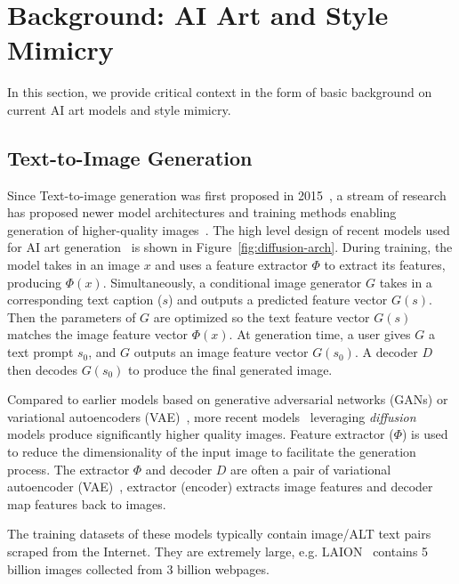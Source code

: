 \secspace
\section{Background: AI Art and Style Mimicry}
\label{sec:motivation}

In this section, we provide critical context in the form of
basic background on current AI art models and style mimicry.

\secspace
\subsection{Text-to-Image Generation}

Since Text-to-image generation was first proposed in
2015~\cite{mansimov2015generating}, a stream of research has proposed newer
model architectures and training methods enabling generation of
higher-quality
images~\cite{radford2015unsupervised,zhang2017stackgan,xu2018attngan,li2019object,zhu2019dm}.  The high level design of
recent models used for AI art
generation~\cite{rombach2022high,ramesh2021zero,d-mini} is shown in
Figure~\ref{fig:diffusion-arch}. During training, the model takes in an image
$x$ and uses a feature extractor $\Phi$ to extract its features, producing
$\Phi(x)$. Simultaneously, a conditional image generator $G$ takes in a
corresponding text caption ($s$) and outputs a predicted feature vector
$G(s)$. Then the parameters of $G$ are optimized so the text feature vector
$G(s)$ matches the image feature vector $\Phi(x)$. At generation time, a user
gives $G$ a text prompt $s_0$, and $G$ outputs an image feature vector
$G(s_0)$. A decoder $D$ then decodes $G(s_0)$ to produce the final generated
image. %

Compared to earlier models based on generative adversarial networks
(GANs) or variational autoencoders
(VAE)~\cite{radford2015unsupervised,zhu2019dm,tao2022df}, more recent
models~\cite{rombach2022high,ramesh2022hierarchical}
leveraging \textit{diffusion} models
produce significantly higher quality images. Feature extractor ($\Phi$) is
used to reduce the dimensionality of the input image to facilitate the
generation process. The extractor $\Phi$ and decoder $D$ are often a pair of
variational autoencoder (VAE)~\cite{rombach2022high,ramesh2021zero}, \ie
extractor (encoder) extracts image features and decoder map features back to
images.

 The training datasets of these models
typically contain image/ALT text pairs scraped from the Internet. They
are extremely large, e.g. LAION~\cite{schuhmann2022laion} contains 5 billion
images collected from 3 billion webpages.  

